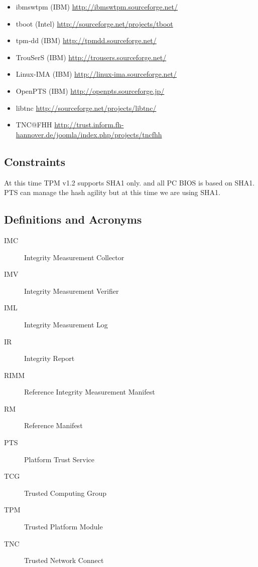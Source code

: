 \documentclass[12pt,a4paper]{article}
\begin{document}
\begin{itemize}
\item ibmswtpm (IBM) \url{http://ibmswtpm.sourceforge.net/}
\item tboot (Intel) \url{http://sourceforge.net/projects/tboot}
\item tpm-dd (IBM) \url{http://tpmdd.sourceforge.net/}
\item TrouSerS (IBM) \url{http://trousers.sourceforge.net/}
\item Linux-IMA (IBM) \url{http://linux-ima.sourceforge.net/} 
\item OpenPTS (IBM) \url{http://openpts.sourceforge.jp/}
\item libtnc \url{http://sourceforge.net/projects/libtnc/}
\item TNC@FHH \url{http://trust.inform.fh-hannover.de/joomla/index.php/projects/tncfhh}
\end{itemize}


\subsection{Constraints}

At this time TPM v1.2 supports SHA1 only.
and all PC BIOS is based on SHA1.
PTS can manage the hash agility but at this time we are using SHA1. 


\subsection{Definitions and Acronyms}

\begin{description}
 \item[IMC]  Integrity Measurement Collector
 \item[IMV]  Integrity Measurement Verifier
 \item[IML]  Integrity Measurement Log
 \item[IR]   Integrity Report
 \item[RIMM] Reference Integrity Measurement Manifest
 \item[RM]   Reference Manifest
 \item[PTS]  Platform Trust Service
 \item[TCG]  Trusted Computing Group
 \item[TPM]  Trusted Platform Module
 \item[TNC]  Trusted Network Connect
\end{description}

\clearpage 
\end{document}
